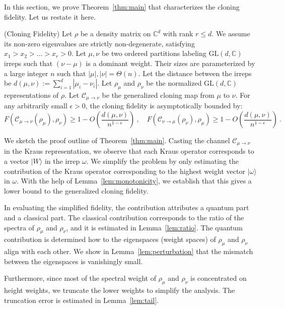 \documentclass[a4paper,onecolumn,11pt]{quantumarticle}
\providecommand{\customgenericname}{}
\newenvironment{mthm}[1]{%
  \renewcommand\customgenericname{Theorem}%
  \renewcommand\theinnercustomgeneric{#1}%
  \innercustomgeneric
}{\endinnercustomgeneric}
\newcommand{\ket}[1]{| #1 \rangle}
\def\C{\mathcal{C}}
\begin{document}
In this section, we prove Theorem~\ref{thm:main} that characterizes the cloning fidelity. Let us restate it here.

\begin{mthm}{1}(Cloning Fidelity)
    Let $\rho$ be a density matrix on $\mathbb{C}^d$ with rank $r \le d$. We assume its non-zero eigenvalues are strictly non-degenerate, satisfying $x_1 > x_2 > \dots > x_r > 0$. Let $\mu, \nu$ be two ordered partitions labeling $\mathrm{GL}(d,\mathbb C)$ irreps such that $(\nu-\mu)$ is a dominant weight. Their sizes are parameterized by a large integer $n$ such that $|\mu|,|\nu|=\Theta(n)$. Let the distance between the irreps be $d(\mu,\nu) := \sum_{i=1}^d |\mu_i-\nu_i|$. Let $\rho_{\mu}$ and $\rho_\nu$ be the normalized $\mathrm{GL}(d,\mathbb C)$ representations of $\rho$. Let $\C_{\mu\to\nu}$ be the generalized cloning map from $\mu$ to $\nu$. For any arbitrarily small $\epsilon>0$, the cloning fidelity is asymptotically bounded by:
    \begin{equation}
        F(\C_{\mu\to\nu}(\rho_\mu), \rho_\nu)\ge 1-O\left(\frac{d(\mu,\nu)}{n^{1-\epsilon}}\right)\ ,\quad F(\C_{\nu\to\mu}(\rho_\nu), \rho_\mu)\ge 1-O\left(\frac{d(\mu,\nu)}{n^{1-\epsilon}}\right) \ .
    \end{equation}
\end{mthm}

We sketch the proof outline of Theorem~\ref{thm:main}. Casting the channel $\C_{\mu\to\nu}$ in the Kraus representation, we observe that each Kraus operator corresponds to a vector $\ket{W}$ in the irrep $\omega$. We simplify the problem by only estimating the contribution of the Kraus operator corresponding to the highest weight vector $\ket{\omega}$ in $\omega$. With the help of Lemma~\ref{lem:monotonicity}, we establish that this gives a lower bound to the generalized cloning fidelity.

In evaluating the simplified fidelity, the contribution attributes a quantum part and a classical part. The classical contribution corresponds to the ratio of the spectra of $\rho_\mu$ and $\rho_\nu$, and it is estimated in Lemma~\ref{lem:ratio}. The quantum contribution is determined how to the eigenspaces (weight spaces) of $\rho_\mu$ and $\rho_\nu$ align with each other. We show in Lemma~\ref{lem:perturbation} that the mismatch between the eigenspaces is vanishingly small.

Furthermore, since most of the spectral weight of $\rho_\mu$ and $\rho_\nu$ is concentrated on height weights, we truncate the lower weights to simplify the analysis. The truncation error is estimated in Lemma~\ref{lem:tail}. 
\end{document}
